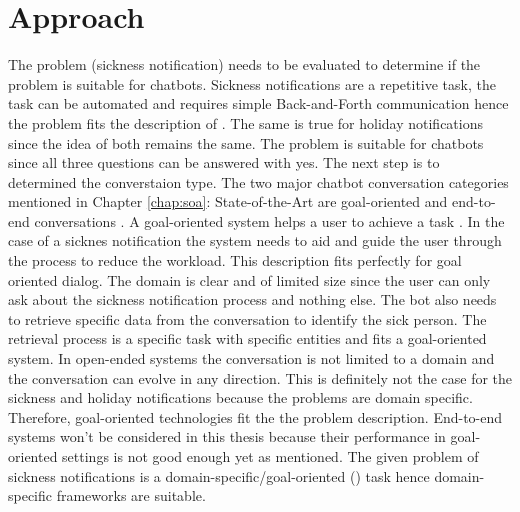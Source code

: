 
\section{Approach}
The problem (sickness notification) needs to be evaluated to determine if the problem is suitable for chatbots.
Sickness notifications are a repetitive task, the task can be automated and requires simple Back-and-Forth communication hence the problem fits the description of \citet{buiildChatbotsPython}.
The same is true for holiday notifications since the idea of both remains the same.
The problem is suitable for chatbots since all three questions can be answered with yes.
The next step is to determined the converstaion type.
The two major chatbot conversation categories mentioned in Chapter \ref{chap:soa}: State-of-the-Art are goal-oriented 
and end-to-end conversations \cite{williams2017hybrid, bordes2016learning, rahman2017programming}.
A goal-oriented system helps a user to achieve a task \cite{rahman2017programming}.
In the case of a sicknes notification the system needs to aid and guide the user through the process to reduce the workload.
This description fits perfectly for goal oriented dialog.
The domain is clear and of limited size since the user can only ask about the sickness notification process and nothing else.
The bot also needs to retrieve specific data from the conversation to identify the sick person.
The retrieval process is a specific task with specific entities and fits a goal-oriented system.
In open-ended systems the conversation is not limited to a domain and the conversation can evolve in any direction.
This is definitely not the case for the sickness and holiday notifications because the problems are domain specific.
Therefore, goal-oriented technologies fit the the problem description.
End-to-end systems won't be considered in this thesis because their performance in goal-oriented settings is not good enough yet as 
\citet{bordes2016learning} mentioned.
The given problem of sickness notifications is a domain-specific/goal-oriented 
(\citet{deshpande2017survey, luis2015williams, braunEvaluatingNLU, williams2017hybrid}) 
task hence domain-specific frameworks are suitable.

